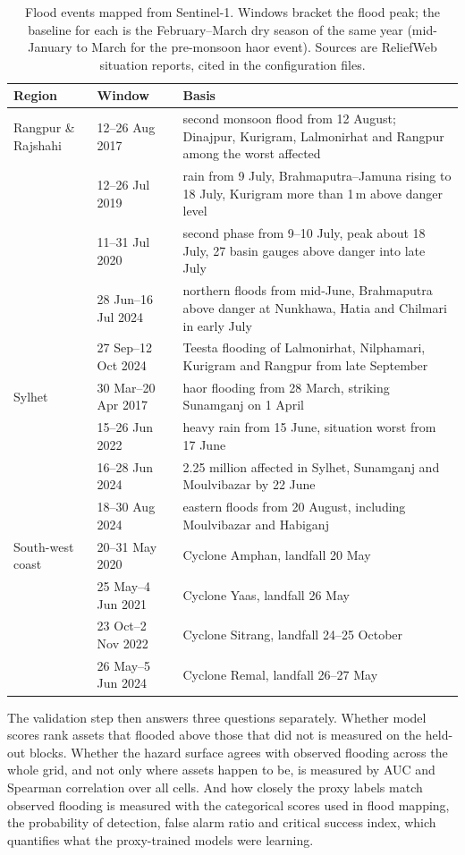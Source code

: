 \documentclass[10pt,a4paper,twocolumn]{article}
\begin{document}
\begin{table}[t]
\centering
\small
\begin{tabularx}{\textwidth}{llX}
\toprule
Region & Window & Basis \\
\midrule
Rangpur \& Rajshahi & 12--26 Aug 2017 & second monsoon flood from 12 August; Dinajpur, Kurigram, Lalmonirhat and Rangpur among the worst affected \\
 & 12--26 Jul 2019 & rain from 9 July, Brahmaputra--Jamuna rising to 18 July, Kurigram more than 1\,m above danger level \\
 & 11--31 Jul 2020 & second phase from 9--10 July, peak about 18 July, 27 basin gauges above danger into late July \\
 & 28 Jun--16 Jul 2024 & northern floods from mid-June, Brahmaputra above danger at Nunkhawa, Hatia and Chilmari in early July \\
 & 27 Sep--12 Oct 2024 & Teesta flooding of Lalmonirhat, Nilphamari, Kurigram and Rangpur from late September \\
\midrule
Sylhet & 30 Mar--20 Apr 2017 & haor flooding from 28 March, striking Sunamganj on 1 April \\
 & 15--26 Jun 2022 & heavy rain from 15 June, situation worst from 17 June \\
 & 16--28 Jun 2024 & 2.25 million affected in Sylhet, Sunamganj and Moulvibazar by 22 June \\
 & 18--30 Aug 2024 & eastern floods from 20 August, including Moulvibazar and Habiganj \\
\midrule
South-west coast & 20--31 May 2020 & Cyclone Amphan, landfall 20 May \\
 & 25 May--4 Jun 2021 & Cyclone Yaas, landfall 26 May \\
 & 23 Oct--2 Nov 2022 & Cyclone Sitrang, landfall 24--25 October \\
 & 26 May--5 Jun 2024 & Cyclone Remal, landfall 26--27 May \\
\bottomrule
\end{tabularx}
\caption{Flood events mapped from Sentinel-1. Windows bracket the flood peak; the baseline for each is the February--March dry season of the same year (mid-January to March for the pre-monsoon haor event). Sources are ReliefWeb situation reports, cited in the configuration files.}
\label{tab:events}
\end{table}

The validation step then answers three questions separately. Whether model scores rank assets that flooded above those that did not is measured on the held-out blocks. Whether the hazard surface agrees with observed flooding across the whole grid, and not only where assets happen to be, is measured by AUC and Spearman correlation over all cells. And how closely the proxy labels match observed flooding is measured with the categorical scores used in flood mapping, the probability of detection, false alarm ratio and critical success index, which quantifies what the proxy-trained models were learning.
\end{document}
